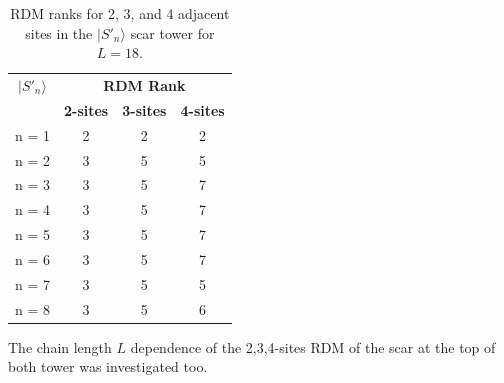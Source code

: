 \documentclass[11pt]{article}
\begin{document}
\begin{itemize}
\begin{itemize}
	 \begin{table}[H]
	\centering
	\begin{tabular}{|c|ccc|}
	\hline
	\textbf{$|S'_n\rangle$} & \multicolumn{3}{c|}{\textbf{RDM Rank}} \\
	\cline{2-4}
	& \textbf{2-sites} & \textbf{3-sites} & \textbf{4-sites} \\
	\hline
	 n = 1 & 2 & 2 & 2 \\
	 n = 2 & 3 & 5 & 5 \\
	 n = 3 & 3 & 5 & 7 \\
	 n = 4 & 3 & 5 & 7 \\  
	 n = 5 & 3 & 5 & 7 \\
	 n = 6 & 3 & 5 & 7 \\
	 n = 7 & 3 & 5 & 5 \\
	 n = 8 & 3 & 5 & 6 \\
	\hline
	\end{tabular}
	\caption{RDM ranks for 2, 3, and 4 adjacent sites in the $|S'_n\rangle$ scar tower for $L=18$.}
	\label{tab:ranks2}
	\end{table}
	
	The chain length $L$  dependence of the 2,3,4-sites RDM of the scar at the top of both tower was investigated too.
	

\end{itemize}
\end{itemize}
\end{document}

